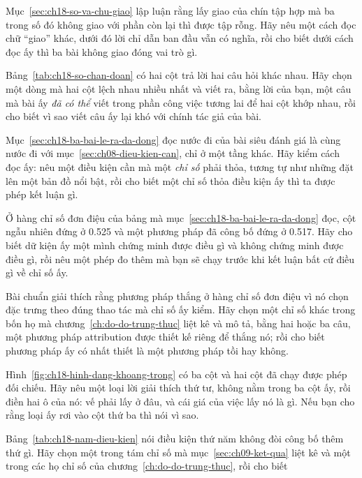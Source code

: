 \cauhoi
\begin{cauhoids}
  \item Mục~\ref{sec:ch18-so-va-chu-giao} lập luận rằng lấy giao của chín tập hợp
mà ba trong số đó không giao với phần còn lại thì được tập rỗng. Hãy nêu một cách
đọc chữ \enquote{giao} khác, dưới đó lời chỉ dẫn ban đầu vẫn có nghĩa, rồi cho
biết dưới cách đọc ấy thì ba bài không giao đóng vai trò gì.
  \item Bảng~\ref{tab:ch18-so-chan-doan} có hai cột trả lời hai câu hỏi khác
nhau. Hãy chọn một dòng mà hai cột lệch nhau nhiều nhất và viết ra, bằng lời của
bạn, một câu mà bài ấy \emph{đã có thể} viết trong phần công việc tương lai để
hai cột khớp nhau, rồi cho biết vì sao viết câu ấy lại khó với chính tác giả của
bài.
  \item Mục~\ref{sec:ch18-ba-bai-le-ra-da-dong} đọc nước đi của bài siêu đánh giá
là cùng nước đi với mục~\ref{sec:ch08-dieu-kien-can}, chỉ ở một tầng khác. Hãy
kiểm cách đọc ấy: nêu một điều kiện cần mà một \emph{chỉ số} phải thỏa, tương tự
như những  đặt lên một bản đồ nổi bật, rồi cho biết một
chỉ số thỏa điều kiện ấy thì ta được phép kết luận gì.
  \item Ở hàng chỉ số đơn điệu của bảng mà mục~\ref{sec:ch18-ba-bai-le-ra-da-dong}
đọc, cột ngẫu nhiên đứng ở 0.525 và một phương pháp đã công bố đứng ở 0.517. Hãy
cho biết dữ kiện ấy một mình chứng minh được điều gì và không chứng minh được
điều gì, rồi nêu một phép đo thêm mà bạn sẽ chạy trước khi kết luận bất cứ điều
gì về chỉ số ấy.
  \item Bài chuẩn giải thích rằng phương pháp thắng ở hàng chỉ số đơn điệu vì nó
chọn đặc trưng theo đúng thao tác mà chỉ số ấy kiểm. Hãy chọn một chỉ số khác
trong bốn họ mà chương~\ref{ch:do-do-trung-thuc} liệt kê và mô tả, bằng hai hoặc
ba câu, một phương pháp attribution được thiết kế riêng để thắng nó; rồi cho biết
phương pháp ấy có nhất thiết là một phương pháp tồi hay không.
  \item Hình~\ref{fig:ch18-hinh-dang-khoang-trong} có ba cột và hai cột đã chạy
được phép đối chiếu. Hãy nêu một loại lời giải thích thứ tư, không nằm trong ba
cột ấy, rồi điền hai ô của nó: vế phải lấy ở đâu, và cái giá của việc lấy nó là
gì. Nếu bạn cho rằng loại ấy rơi vào cột thứ ba thì nói vì sao.
  \item Bảng~\ref{tab:ch18-nam-dieu-kien} nói điều kiện thứ năm không đòi công bố
thêm thứ gì. Hãy chọn một trong tám chỉ số mà mục~\ref{sec:ch09-ket-qua} liệt kê
và một trong các họ chỉ số của chương~\ref{ch:do-do-trung-thuc}, rồi cho biết

\end{cauhoids}
